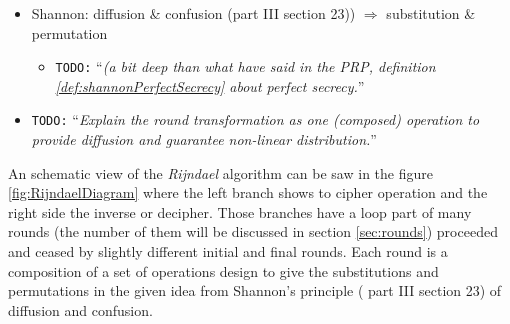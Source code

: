 \documentclass[10pt,a4paper,twoside]{llncs}
\newcommand{\todo}[1]{\texttt{\color{red}TODO:} ``\emph{#1}''}
\begin{document}
\begin{itemize}
 \item Shannon: diffusion \& confusion \cite{shannon-comTheorySecSys} (part III section 23)) $\Rightarrow$ substitution \& permutation
 \begin{itemize}
  \item \todo{(a bit deep than what have said in the PRP, definition \ref{def:shannonPerfectSecrecy} about perfect secrecy.}
 \end{itemize}
 \item \todo{Explain the round transformation as one (composed) operation to provide diffusion and guarantee non-linear distribution.}
\end{itemize}

An schematic view of the \emph{Rijndael} algorithm can be saw in the figure \ref{fig:RijndaelDiagram} where the left branch shows to cipher operation and the right side the inverse or decipher. Those branches have a loop part of many rounds (the number of them will be discussed in section \ref{sec:rounds}) proceeded and ceased by slightly different initial and final rounds. Each round is a composition of a set of operations design to give the substitutions and permutations in the given idea from Shannon's principle (\cite{shannon-comTheorySecSys} part III section 23) of diffusion and confusion.
\end{document}

